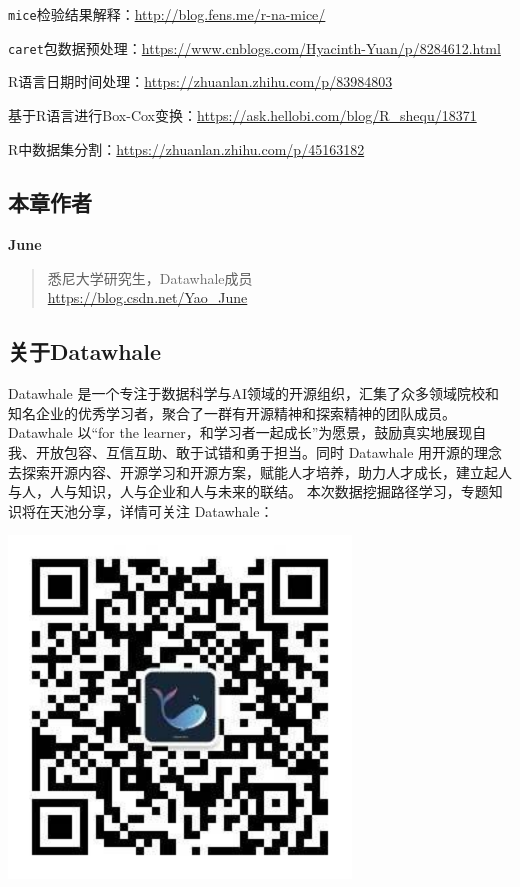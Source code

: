 \documentclass[]{ctexbook}
\newcommand{\passthrough}[1]{#1}
\begin{document}
\passthrough{\lstinline!mice!}检验结果解释：\url{http://blog.fens.me/r-na-mice/}

\passthrough{\lstinline!caret!}包数据预处理：\url{https://www.cnblogs.com/Hyacinth-Yuan/p/8284612.html}

R语言日期时间处理：\url{https://zhuanlan.zhihu.com/p/83984803}

基于R语言进行Box-Cox变换：\url{https://ask.hellobi.com/blog/R_shequ/18371}

R中数据集分割：\url{https://zhuanlan.zhihu.com/p/45163182}

\hypertarget{ux672cux7ae0ux4f5cux8005-2}{%
\subsection*{本章作者}\label{ux672cux7ae0ux4f5cux8005-2}}


\textbf{June}

\begin{quote}
悉尼大学研究生，Datawhale成员\\
\url{https://blog.csdn.net/Yao_June}
\end{quote}

\hypertarget{ux5173ux4e8edatawhale-2}{%
\subsection*{关于Datawhale}\label{ux5173ux4e8edatawhale-2}}


Datawhale 是一个专注于数据科学与AI领域的开源组织，汇集了众多领域院校和知名企业的优秀学习者，聚合了一群有开源精神和探索精神的团队成员。Datawhale 以``for the learner，和学习者一起成长''为愿景，鼓励真实地展现自我、开放包容、互信互助、敢于试错和勇于担当。同时 Datawhale 用开源的理念去探索开源内容、开源学习和开源方案，赋能人才培养，助力人才成长，建立起人与人，人与知识，人与企业和人与未来的联结。 本次数据挖掘路径学习，专题知识将在天池分享，详情可关注 Datawhale：

\includegraphics[width=3.58in]{image/logo}
\end{document}
